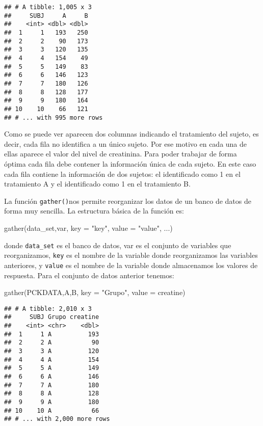 \documentclass[
]{book}
\newenvironment{Shaded}{\begin{snugshade}}{\end{snugshade}}
\newcommand{\AttributeTok}[1]{\textcolor[rgb]{0.77,0.63,0.00}{#1}}
\newcommand{\FunctionTok}[1]{\textcolor[rgb]{0.00,0.00,0.00}{#1}}
\newcommand{\NormalTok}[1]{#1}
\newcommand{\StringTok}[1]{\textcolor[rgb]{0.31,0.60,0.02}{#1}}
\begin{document}
\begin{verbatim}
## # A tibble: 1,005 x 3
##     SUBJ     A     B
##    <int> <dbl> <dbl>
##  1     1   193   250
##  2     2    90   173
##  3     3   120   135
##  4     4   154    49
##  5     5   149    83
##  6     6   146   123
##  7     7   180   126
##  8     8   128   177
##  9     9   180   164
## 10    10    66   121
## # ... with 995 more rows
\end{verbatim}

Como se puede ver aparecen dos columnas indicando el tratamiento del sujeto, es decir, cada fila no identifica a un único sujeto. Por ese motivo en cada una de ellas aparece el valor del nivel de creatinina. Para poder trabajar de forma óptima cada fila debe contener la información única de cada sujeto. En este caso cada fila contiene la información de dos sujetos: el identificado como 1 en el tratamiento A y el identificado como 1 en el tratamiento B.

La función \texttt{gather()}nos permite reorganizar los datos de un banco de datos de forma muy sencilla. La estructura básica de la función es:

\begin{Shaded}
\begin{Highlighting}[]
\FunctionTok{gather}\NormalTok{(data\_set,var, }\AttributeTok{key =} \StringTok{"key"}\NormalTok{, }\AttributeTok{value =} \StringTok{"value"}\NormalTok{, ...)}
\end{Highlighting}
\end{Shaded}

donde \texttt{data\_set} es el banco de datos, var es el conjunto de variables que reorganizamos, \texttt{key} es el nombre de la variable donde reorganizamos las variables anteriores, y \texttt{value} es el nombre de la variable donde almacenamos los valores de respuesta. Para el conjunto de datos anterior tenemos:

\begin{Shaded}
\begin{Highlighting}[]
\FunctionTok{gather}\NormalTok{(PCKDATA,}\StringTok{\textasciigrave{}}\AttributeTok{A}\StringTok{\textasciigrave{}}\NormalTok{,}\StringTok{\textasciigrave{}}\AttributeTok{B}\StringTok{\textasciigrave{}}\NormalTok{, }\AttributeTok{key =} \StringTok{"Grupo"}\NormalTok{, }\AttributeTok{value =}\NormalTok{ creatine)}
\end{Highlighting}
\end{Shaded}

\begin{verbatim}
## # A tibble: 2,010 x 3
##     SUBJ Grupo creatine
##    <int> <chr>    <dbl>
##  1     1 A          193
##  2     2 A           90
##  3     3 A          120
##  4     4 A          154
##  5     5 A          149
##  6     6 A          146
##  7     7 A          180
##  8     8 A          128
##  9     9 A          180
## 10    10 A           66
## # ... with 2,000 more rows
\end{verbatim}
\end{document}
